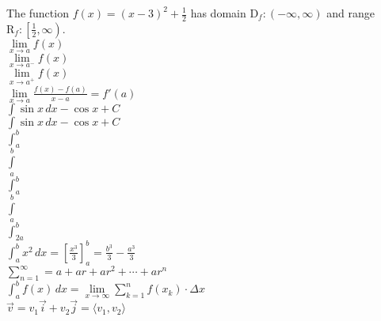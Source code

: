 \documentclass[11pt]{article}
\begin{document}
    The function $f(x)=(x-3)^2+\frac{1}{2}$ has domain $ \mathrm{D}_f: (-\infty, \infty)$ and range $ \mathrm{R}_f: \left[ \frac{1}{2},\infty \right) $. \\

    $\lim \limits_{x \to a} f(x) $ \\
    
    $\lim \limits_{x \to a^-} f(x) $ \\

    $\lim \limits_{x \to a^+} f(x) $ \\
    
    $ \displaystyle{\lim \limits_{x \to a} \frac{f(x) - f(a)}{x-a} = f'(a)}$ \\

    $ \int \sin x  \,dx -\cos x + C $ \\

    $ \displaystyle{\int \sin x  \,dx -\cos x + C} $ \\ %

    $ \int_a^b $ \\

    $ \int \limits_a^b $ \\

    $ \displaystyle \int_a^b $ \\

    $ \displaystyle \int \limits_a^b $ \\

    $ \displaystyle \int_{2a}^b $ \\
    
    $ \displaystyle \int_{a}^{b} x^2 \,dx = \left[ \frac{x^3}{3} \right]_a^b = \frac{b^3}{3} - \frac{a^3}{3}$ \\

    $ \displaystyle \sum \limits_{n=1}^{\infty} = a + ar + ar^2 + \cdots + ar^n $ \\

    $ \displaystyle \int_a^b f(x) \,dx = \lim \limits_{x \to \infty} \sum_{k=1}^{n} f(x_k) \cdot \Delta x $ \\

    $ \vec{v} = v_1 \vec{i} + v_2 \vec{j} = \langle v_1, v_2 \rangle $ \\
    
\end{document}
